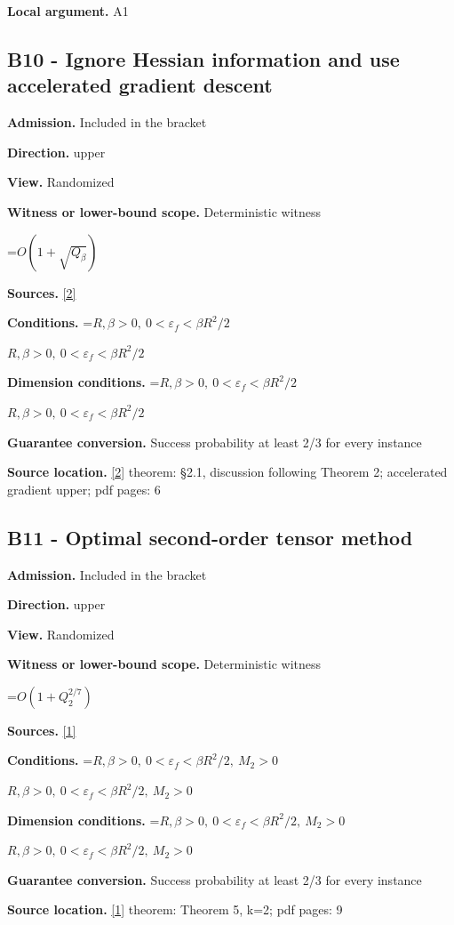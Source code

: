 \documentclass[10pt,a4paper]{article}
\newcommand{\AtlasMath}[1]{\par\begingroup\centering\setbox0=\hbox{$\displaystyle #1$}\ifdim\wd0>1.4\linewidth\typeout{ATLAS WIDE FORMULA: \the\wd0}\fi\ifdim\wd0>\linewidth\resizebox{\linewidth}{!}{\box0}\else\box0\fi\par\endgroup}
\newcommand{\AtlasInlineMath}[1]{\begingroup\setbox0=\hbox{$#1$}\ifdim\wd0>.4\linewidth\endgroup\AtlasMath{#1}\else\endgroup$#1$\fi}
\begin{document}
\textbf{Local argument.} A1

\subsection{B10 - Ignore Hessian information and use accelerated gradient descent}
\textbf{Admission.} Included in the bracket

\textbf{Direction.} upper

\textbf{View.} Randomized

\textbf{Witness or lower-bound scope.} Deterministic witness

\AtlasMath{O(1+\sqrt{Q_\beta})}
\textbf{Sources.} \href{https://arxiv.org/pdf/1705.07260v2}{[2]}

\textbf{Conditions.} \AtlasInlineMath{R,\beta>0,\ 0<\varepsilon_f<\beta R^2/2}

\textbf{Dimension conditions.} \AtlasInlineMath{R,\beta>0,\ 0<\varepsilon_f<\beta R^2/2}

\textbf{Guarantee conversion.} Success probability at least 2/3 for every instance

\textbf{Source location.} \href{https://arxiv.org/pdf/1705.07260v2}{[2]} theorem: §2.1, discussion following Theorem 2; accelerated gradient upper; pdf pages: 6

\subsection{B11 - Optimal second-order tensor method}
\textbf{Admission.} Included in the bracket

\textbf{Direction.} upper

\textbf{View.} Randomized

\textbf{Witness or lower-bound scope.} Deterministic witness

\AtlasMath{O(1+Q_2^{2/7})}
\textbf{Sources.} \href{https://arxiv.org/pdf/2205.09647v1}{[1]}

\textbf{Conditions.} \AtlasInlineMath{R,\beta>0,\ 0<\varepsilon_f<\beta R^2/2,\ M_2>0}

\textbf{Dimension conditions.} \AtlasInlineMath{R,\beta>0,\ 0<\varepsilon_f<\beta R^2/2,\ M_2>0}

\textbf{Guarantee conversion.} Success probability at least 2/3 for every instance

\textbf{Source location.} \href{https://arxiv.org/pdf/2205.09647v1}{[1]} theorem: Theorem 5, k=2; pdf pages: 9
\end{document}
